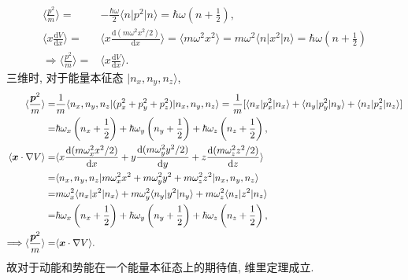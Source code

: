 \documentclass{assignment}
\begin{document}
\begin{sol}
\begin{itemize}
        \begin{align}
            \langle\frac{p^2}{m}\rangle=&-\frac{\hbar\omega}{2}\langle n\rvert p^2\lvert n\rangle=\hbar\omega\left(n+\frac{1}{2}\right),\\
            \langle x\frac{\mathrm{d}V}{\mathrm{d}x}\rangle=&\langle x\frac{\mathrm{d}(m\omega^2x^2/2)}{\mathrm{d}x}\rangle=\langle m\omega^2x^2\rangle=m\omega^2\langle n\rvert x^2\lvert n\rangle=\hbar\omega\left(n+\frac{1}{2}\right)\\
            \Longrightarrow\langle\frac{p^2}{m}\rangle=&\langle x\frac{\mathrm{d}V}{\mathrm{d}x}\rangle.
        \end{align}
        三维时, 对于能量本征态 $\lvert n_x,n_y,n_z\rangle$,
        \begin{align}
            \notag\langle\frac{\bm{p}^2}{m}\rangle=&\frac{1}{m}\langle n_x,n_y,n_z\rvert(p_x^2+p_y^2+p_z^2)\lvert n_x,n_y,n_z\rangle=\frac{1}{m}[\langle n_x\rvert p_x^2\lvert n_x\rangle+\langle n_y\rvert p_y^2\lvert n_y\rangle+\langle n_z\rvert p_z^2\lvert n_z\rangle]\\
            =&\hbar\omega_x\left(n_x+\frac{1}{2}\right)+\hbar\omega_y\left(n_y+\frac{1}{2}\right)+\hbar\omega_z\left(n_z+\frac{1}{2}\right),\\
            \notag\langle\bm{x}\cdot\nabla V\rangle=&\langle x\frac{\mathrm{d}(m\omega_x^2x^2/2)}{\mathrm{d}x}+y\frac{\mathrm{d}(m\omega_y^2y^2/2)}{\mathrm{d}y}+z\frac{\mathrm{d}(m\omega_z^2z^2/2)}{\mathrm{d}z}\rangle\\
            \notag=&\langle n_x,n_y,n_z\rvert m\omega_x^2x^2+m\omega_y^2y^2+m\omega_z^2z^2\lvert n_x,n_y,n_z\rangle\\
            \notag=&m\omega_x^2\langle n_x\rvert x^2\lvert n_x\rangle+m\omega_y^2\langle n_y\rvert y^2\lvert n_y\rangle+m\omega_z^2\langle n_z\rvert z^2\lvert n_z\rangle\\
            =&\hbar\omega_x\left(n_x+\frac{1}{2}\right)+\hbar\omega_y\left(n_y+\frac{1}{2}\right)+\hbar\omega_z\left(n_z+\frac{1}{2}\right),\\
            \Longrightarrow\langle\frac{\bm{p}^2}{m}\rangle=&\langle\bm{x}\cdot\nabla V\rangle.
        \end{align}
        故对于动能和势能在一个能量本征态上的期待值, 维里定理成立.
    \end{itemize}
\end{sol}
\end{document}
